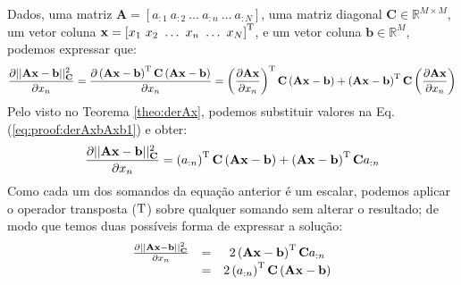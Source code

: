 \begin{myproofT}\label{proof:theo:derAxbAxb}
Dados,
uma matriz $\mathbf{A}=\left[a_{:1}~ a_{:2}~ \hdots~ a_{:n}~ \hdots~ a_{:N}\right]$, 
uma matriz diagonal $\mathbf{C}\in \mathbb{R}^{M\times M}$, 
um vetor coluna $\mathbf{x}=\left[x_{1}~ x_{2}~ \hdots~ x_{n}~ \hdots~ x_{N}\right]^{\mathrm{T}}$, e 
um vetor coluna $\mathbf{b}\in \mathbb{R}^{M}$, 
podemos expressar que:
\begin{equation}\label{eq:proof:derAxbAxb1}
\frac{\partial ||\mathbf{A}\mathbf{x}-\mathbf{b}||_{\mathbf{C}}^2}{\partial x_n} =
\frac{\partial \left(\mathbf{A}\mathbf{x}-\mathbf{b}\right)^{\mathrm{T}}\mathbf{C}\left(\mathbf{A}\mathbf{x}-\mathbf{b}\right)}{\partial x_n}=
 \left(\frac{\partial\mathbf{A}\mathbf{x}}{\partial x_n}\right)^{\mathrm{T}}\mathbf{C}\left(\mathbf{A}\mathbf{x}-\mathbf{b}\right)+
 \left(\mathbf{A}\mathbf{x}-\mathbf{b}\right)^{\mathrm{T}}\mathbf{C}\left(\frac{\partial\mathbf{A}\mathbf{x}}{\partial x_n}\right)
\end{equation}
Pelo visto no Teorema \ref{theo:derAx}, podemos substituir valores na Eq. (\ref{eq:proof:derAxbAxb1})
e obter:
\begin{equation}\label{eq:proof:derAxbAxb2}
\frac{\partial ||\mathbf{A}\mathbf{x}-\mathbf{b}||_{\mathbf{C}}^{2}}{\partial x_n}=
\left(a_{:n}\right)^{\mathrm{T}}\mathbf{C}\left( \mathbf{A}\mathbf{x}-\mathbf{b}\right) +
\left(\mathbf{A}\mathbf{x}-\mathbf{b}\right)^{\mathrm{T}}\mathbf{C} a_{:n}
\end{equation}
Como cada um dos somandos da equação anterior é um escalar, podemos aplicar o operador
transposta ($\mathrm{T}$) sobre qualquer somando sem alterar o resultado; de modo que temos duas possíveis
forma de expressar a solução:
\begin{equation}
\begin{matrix}
\frac{\partial ||\mathbf{A}\mathbf{x}-\mathbf{b}||_{\mathbf{C}}^2 }{\partial x_n}&=&
2\left(\mathbf{A}\mathbf{x}-\mathbf{b}\right)^{\mathrm{T}}\mathbf{C}a_{:n}\\
~&=& 2\left(a_{:n}\right)^{\mathrm{T}}\mathbf{C}\left(\mathbf{A}\mathbf{x}-\mathbf{b}\right)
\end{matrix}
\end{equation}
\end{myproofT}


